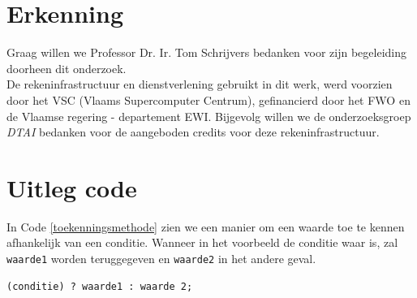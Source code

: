 \documentclass{article}
\begin{document}
\section*{Erkenning}
Graag willen we Professor Dr. Ir. Tom Schrijvers bedanken voor zijn begeleiding doorheen dit onderzoek.\\
De rekeninfrastructuur en dienstverlening gebruikt in dit werk, werd voorzien door het VSC (Vlaams Supercomputer Centrum), gefinancierd door het FWO en de Vlaamse regering - departement EWI.
Bijgevolg willen we de onderzoeksgroep \textit{DTAI} bedanken voor de aangeboden credits voor deze rekeninfrastructuur.

\appendix
\section{Uitleg code}\label{UitlegCode}
In Code \ref{toekenningsmethode} zien we een manier om een waarde toe te kennen afhankelijk van een conditie.
Wanneer in het voorbeeld de conditie waar is, zal \texttt{waarde1} worden teruggegeven en \texttt{waarde2} in het andere geval.
\begin{lstlisting}[caption=Speciale toekenningsstructuur, label=toekenningsmethode]
(conditie) ? waarde1 : waarde 2;
\end{lstlisting}




\end{document}
